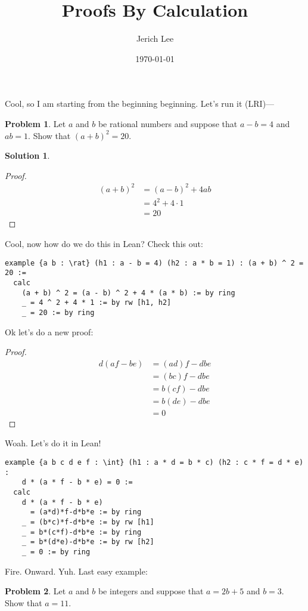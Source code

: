 \documentclass[12pt]{article}
\title{Proofs By Calculation}
\author{Jerich Lee}
\date{\today}
\theoremstyle{definition} %
\newtheorem{solution}{Solution}
\newtheorem{problem}{Problem}
\theoremstyle{plain} %
\begin{document}
\maketitle
Cool, so I am starting from the beginning beginning. Let's run it (LRI)—

\begin{problem}
   Let \(a\) and \(b\) be rational numbers and suppose that \(a-b=4\) and \(ab=1\). Show that \((a+b)^{2}=20\). 
\end{problem}
\begin{solution}
    \begin{proof}
        \begin{align}
            (a+b)^{2}&=(a-b)^{2}+4ab \\[10pt]
           &=4^{2}+4 \cdot 1 \\[10pt] 
           &= 20 
        \end{align}
    \end{proof}
\end{solution}
Cool, now how do we do this in Lean? Check this out:
\begin{lstlisting}
example {a b : \rat} (h1 : a - b = 4) (h2 : a * b = 1) : (a + b) ^ 2 = 20 :=
  calc
    (a + b) ^ 2 = (a - b) ^ 2 + 4 * (a * b) := by ring
    _ = 4 ^ 2 + 4 * 1 := by rw [h1, h2]
    _ = 20 := by ring
\end{lstlisting}
Ok let's do a new proof:
\begin{proof}
    \begin{align}
        d(af-be)&=(ad)f-dbe \\[10pt] 
        &=(bc)f-dbe \\[10pt] 
        &=b(cf)-dbe \\[10pt] 
        &=b(de)-dbe \\[10pt] 
        &=0
    \end{align}
\end{proof}
Woah. Let's do it in Lean!
\begin{lstlisting}
example {a b c d e f : \int} (h1 : a * d = b * c) (h2 : c * f = d * e) :
    d * (a * f - b * e) = 0 :=
  calc
    d * (a * f - b * e)
      = (a*d)*f-d*b*e := by ring
    _ = (b*c)*f-d*b*e := by rw [h1]
    _ = b*(c*f)-d*b*e := by ring
    _ = b*(d*e)-d*b*e := by rw [h2]
    _ = 0 := by ring
\end{lstlisting}
Fire. Onward. Yuh.
Last easy example: 
\begin{problem}
    
Let \(a\) and \(b\) be integers and suppose that \(a=2b+5\) and \(b=3\). Show that \(a=11\).
\end{problem}
\end{document}
